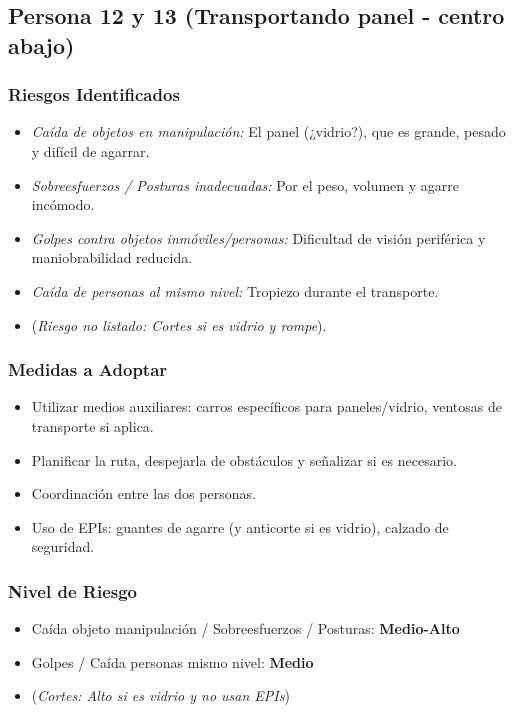 \documentclass[12pt,a4paper]{article}
\begin{document}
	\bigskip\hrulefill\bigskip
	
	\subsection{Persona 12 y 13 (Transportando panel - centro abajo)}
	
	\subsubsection{Riesgos Identificados}
	\begin{itemize}
		\item \textit{Caída de objetos en manipulación:} El panel (¿vidrio?), que es grande, pesado y difícil de agarrar.
		\item \textit{Sobreesfuerzos / Posturas inadecuadas:} Por el peso, volumen y agarre incómodo.
		\item \textit{Golpes contra objetos inmóviles/personas:} Dificultad de visión periférica y maniobrabilidad reducida.
		\item \textit{Caída de personas al mismo nivel:} Tropiezo durante el transporte.
		\item (\textit{Riesgo no listado: Cortes si es vidrio y rompe}).
	\end{itemize}
	
	\subsubsection{Medidas a Adoptar}
	\begin{itemize}
		\item Utilizar medios auxiliares: carros específicos para paneles/vidrio, ventosas de transporte si aplica.
		\item Planificar la ruta, despejarla de obstáculos y señalizar si es necesario.
		\item Coordinación entre las dos personas.
		\item Uso de EPIs: guantes de agarre (y anticorte si es vidrio), calzado de seguridad.
	\end{itemize}
	
	\subsubsection{Nivel de Riesgo}
	\begin{itemize}
		\item Caída objeto manipulación / Sobreesfuerzos / Posturas: \textbf{Medio-Alto}
		\item Golpes / Caída personas mismo nivel: \textbf{Medio}
		\item (\textit{Cortes: Alto si es vidrio y no usan EPIs})
	\end{itemize}
	
\end{document}
